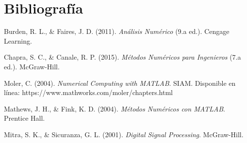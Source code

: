 \documentclass[12pt,a4paper,twoside]{article}  %
\begin{document}
\newpage

\section{Bibliografía}

\begin{thebibliography}{99}

    Burden, R. L., \& Faires, J. D. (2011). \textit{Análisis Numérico} (9.a ed.). Cengage Learning.
    
    Chapra, S. C., \& Canale, R. P. (2015). \textit{Métodos Numéricos para Ingenieros} (7.a ed.). McGraw-Hill.
    
    Moler, C. (2004). \textit{Numerical Computing with MATLAB}. SIAM. Disponible en línea: https://www.mathworks.com/moler/chapters.html
    
    Mathews, J. H., \& Fink, K. D. (2004). \textit{Métodos Numéricos con MATLAB}. Prentice Hall.
    
    Mitra, S. K., \& Sicuranza, G. L. (2001). \textit{Digital Signal Processing}. McGraw-Hill.
    
    \end{thebibliography}
    












\end{document}
